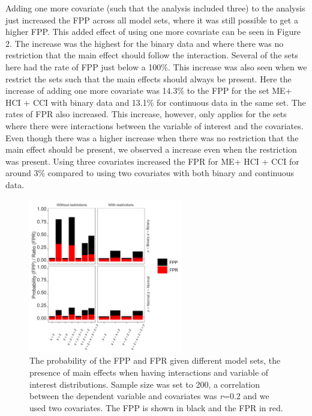 Adding one more covariate (such that the analysis included three) to the analysis just increased the FPP across all model sets, where it was still possible to get a higher FPP. This added effect of using one more covariate can be seen in Figure 2. The increase was the highest for the binary data and where there was no restriction that the main effect should follow the interaction. Several of the sets here had the rate of FPP just below a 100\%. This increase was also seen when we restrict the sets such that the main effects should always be present. Here the increase of adding one more covariate was 14.3\% to the FPP for the set ME+ HCI + CCI with binary data and 13.1\% for continuous data in the same set. The rates of FPR also increased. This increase, however, only applies for the sets where there were interactions between the variable of interest and the covariates. Even though there was a higher increase when there was no restriction that the main effect should be present, we observed a increase even when the restriction was present. Using three covariates increased the FPR for ME+ HCI + CCI for around 3\% compared to using two covariates with both binary and continuous data. 

\begin{figure}[hbt!]
\includegraphics[width=0.6\textwidth]{R/Analysis/Result/Figures/Figure1A.jpeg}
\centering
\caption{The probability of the FPP and FPR given different model sets, the presence of main effects when having interactions and variable of interest distributions. Sample size was set to 200, a correlation between the dependent variable and covariates was \textit{r}=0.2 and we used two covariates. The FPP is shown in black and the FPR in red.}
\label{fig:mainfigure}
\end{figure}

